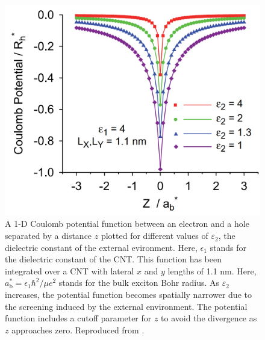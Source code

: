  \begin{figure}[ht]
 	\centering
 	\includegraphics[scale=0.23]{images/chapter_optical_props/coulomb_potl_walsh}
 	\caption{ A 1-D Coulomb potential function between an electron and a hole separated by a distance $z$ plotted for different values of $\varepsilon_2$, the dielectric constant of the external evironment. Here, $\epsilon_1$ stands for the dielectric constant of the CNT. This function has been integrated over a CNT with lateral $x$ and $y$ lengths of 1.1 nm.  Here, $a_\text{b}^* = \epsilon_1 \hbar^2 / \mu e^2$ stands for the bulk exciton Bohr radius. As $\varepsilon_2$ increases, the potential function becomes spatially narrower due to the screening induced by the external environment. The potential function includes a cutoff parameter for $z$ to avoid the divergence as $z$ approaches zero. Reproduced from \cite{walsh2008scaling}.}
 	\label{fig:coulomb_screening_walsh}
 \end{figure}

